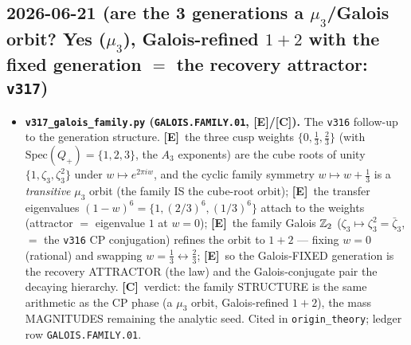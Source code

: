 \documentclass[11pt]{article}
\providecommand{\mE}{\textbf{[E]}}\providecommand{\mC}{\textbf{[C]}}
\begin{document}
\subsection*{2026-06-21 (are the 3 generations a $\mu_3$/Galois orbit? Yes ($\mu_3$), Galois-refined $1{+}2$ with the fixed generation $=$ the recovery attractor: \texttt{v317})}
\begin{itemize}
\item \textbf{\texttt{v317\_galois\_family.py} (\texttt{GALOIS.FAMILY.01}, \mE/\mC).} The \texttt{v316} follow-up to the
  generation structure. \mE\ the three cusp weights $\{0,\tfrac13,\tfrac23\}$ (with $\mathrm{Spec}(Q_+)=\{1,2,3\}$,
  the $A_3$ exponents) are the cube roots of unity $\{1,\zeta_3,\zeta_3^2\}$ under $w\mapsto e^{2\pi i w}$, and the
  cyclic family symmetry $w\mapsto w{+}\tfrac13$ is a \emph{transitive} $\mu_3$ orbit (the family IS the cube-root
  orbit); \mE\ the transfer eigenvalues $(1{-}w)^6=\{1,(2/3)^6,(1/3)^6\}$ attach to the weights (attractor $=$
  eigenvalue $1$ at $w{=}0$); \mE\ the family Galois $\mathbb{Z}_2$ ($\zeta_3\mapsto\zeta_3^2=\bar\zeta_3$, $=$ the
  \texttt{v316} CP conjugation) refines the orbit to $1{+}2$ --- fixing $w{=}0$ (rational) and swapping
  $w{=}\tfrac13\leftrightarrow\tfrac23$; \mE\ so the Galois-FIXED generation is the recovery ATTRACTOR (the law) and
  the Galois-conjugate pair the decaying hierarchy. \mC\ verdict: the family STRUCTURE is the same arithmetic as the
  CP phase (a $\mu_3$ orbit, Galois-refined $1{+}2$), the mass MAGNITUDES remaining the analytic seed. Cited in
  \texttt{origin\_theory}; ledger row \texttt{GALOIS.FAMILY.01}.
\end{itemize}
\end{document}
